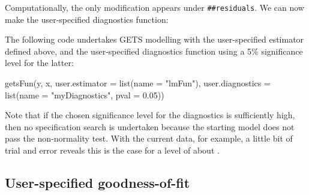 %
Computationally, the only modification appears under \verb|##residuals|. We can now make the user-specified diagnostics function:
%
%
The following code undertakes GETS modelling with the user-specified estimator defined above, and the user-specified diagnostics function using a 5\% significance level for the latter:
%
\begin{example}
  getsFun(y, x, user.estimator = list(name = "lmFun"),
    user.diagnostics = list(name = "myDiagnostics", pval = 0.05))
\end{example}
%
Note that if the chosen significance level for the diagnostics is sufficiently high, then no specification search is undertaken because the starting model does not pass the non-normality test. With the current data, for example, a little bit of trial and error reveals this is the case for a level of about .

\subsection{User-specified goodness-of-fit}

